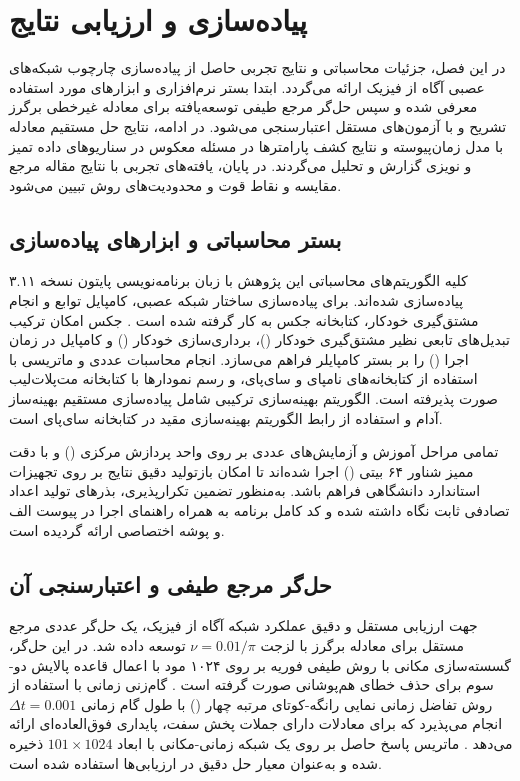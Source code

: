 \chapter{پیاده‌سازی و ارزیابی نتایج}
\label{ch:implementation}

در این فصل، جزئیات محاسباتی و نتایج تجربی حاصل از پیاده‌سازی چارچوب شبکه‌های عصبی آگاه از فیزیک ارائه می‌گردد. ابتدا بستر نرم‌افزاری و ابزارهای مورد استفاده معرفی شده و سپس حل‌گر مرجع طیفی توسعه‌یافته برای معادله غیرخطی برگرز تشریح و با آزمون‌های مستقل اعتبارسنجی می‌شود. در ادامه، نتایج حل مستقیم معادله با مدل زمان‌پیوسته و نتایج کشف پارامترها در مسئله معکوس در سناریوهای داده تمیز و نویزی گزارش و تحلیل می‌گردند. در پایان، یافته‌های تجربی با نتایج مقاله مرجع مقایسه و نقاط قوت و محدودیت‌های روش تبیین می‌شود.

\section{بستر محاسباتی و ابزارهای پیاده‌سازی}
\label{sec:env}

کلیه الگوریتم‌های محاسباتی این پژوهش با زبان برنامه‌نویسی پایتون نسخه ۳.۱۱ پیاده‌سازی شده‌اند. برای پیاده‌سازی ساختار شبکه عصبی، کامپایل توابع و انجام مشتق‌گیری خودکار، کتابخانه جکس به کار گرفته شده است \cite{jax2018}. جکس امکان ترکیب تبدیل‌های تابعی نظیر مشتق‌گیری خودکار ()، برداری‌سازی خودکار () و کامپایل در زمان اجرا () را بر بستر کامپایلر  فراهم می‌سازد. انجام محاسبات عددی و ماتریسی با استفاده از کتابخانه‌های نامپای و سای‌پای، و رسم نمودارها با کتابخانه مت‌پلات‌لیب صورت پذیرفته است. الگوریتم بهینه‌سازی ترکیبی شامل پیاده‌سازی مستقیم بهینه‌ساز آدام و استفاده از رابط الگوریتم بهینه‌سازی مقید  در کتابخانه سای‌پای است.

تمامی مراحل آموزش و آزمایش‌های عددی بر روی واحد پردازش مرکزی () و با دقت ممیز شناور ۶۴ بیتی () اجرا شده‌اند تا امکان بازتولید دقیق نتایج بر روی تجهیزات استاندارد دانشگاهی فراهم باشد. به‌منظور تضمین تکرارپذیری، بذرهای تولید اعداد تصادفی ثابت نگاه داشته شده و کد کامل برنامه به همراه راهنمای اجرا در پیوست الف و پوشه اختصاصی  ارائه گردیده است.

\section{حل‌گر مرجع طیفی و اعتبارسنجی آن}
\label{sec:reference}

جهت ارزیابی مستقل و دقیق عملکرد شبکه آگاه از فیزیک، یک حل‌گر عددی مرجع مستقل برای معادله برگرز با لزجت $\nu = 0.01/\pi$ توسعه داده شد. در این حل‌گر، گسسته‌سازی مکانی با روش طیفی فوریه بر روی ۱۰۲۴ مود با اعمال قاعده پالایش دو-سوم برای حذف خطای هم‌پوشانی صورت گرفته است \cite{trefethen2000}. گام‌زنی زمانی با استفاده از روش تفاضل زمانی نمایی رانگه-کوتای مرتبه چهار () با طول گام زمانی $\Delta t = 0.001$ انجام می‌پذیرد که برای معادلات دارای جملات پخش سفت، پایداری فوق‌العاده‌ای ارائه می‌دهد \cite{kassam2005}. ماتریس پاسخ حاصل بر روی یک شبکه زمانی-مکانی با ابعاد $101 \times 1024$ ذخیره شده و به‌عنوان معیار حل دقیق در ارزیابی‌ها استفاده شده است.

